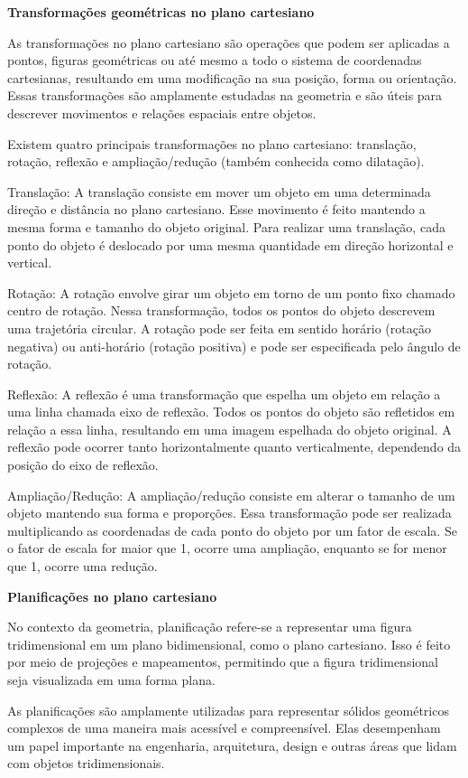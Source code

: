 \textbf{Transformações geométricas no plano cartesiano}

As transformações no plano cartesiano são operações que podem ser
aplicadas a pontos, figuras geométricas ou até mesmo a todo o sistema de
coordenadas cartesianas, resultando em uma modificação na sua posição,
forma ou orientação. Essas transformações são amplamente estudadas na
geometria e são úteis para descrever movimentos e relações espaciais
entre objetos.

Existem quatro principais transformações no plano cartesiano:
translação, rotação, reflexão e ampliação/redução (também conhecida como
dilatação).

Translação: A translação consiste em mover um objeto em uma determinada
direção e distância no plano cartesiano. Esse movimento é feito mantendo
a mesma forma e tamanho do objeto original. Para realizar uma
translação, cada ponto do objeto é deslocado por uma mesma quantidade em
direção horizontal e vertical.

Rotação: A rotação envolve girar um objeto em torno de um ponto fixo
chamado centro de rotação. Nessa transformação, todos os pontos do
objeto descrevem uma trajetória circular. A rotação pode ser feita em
sentido horário (rotação negativa) ou anti-horário (rotação positiva) e
pode ser especificada pelo ângulo de rotação.

Reflexão: A reflexão é uma transformação que espelha um objeto em
relação a uma linha chamada eixo de reflexão. Todos os pontos do objeto
são refletidos em relação a essa linha, resultando em uma imagem
espelhada do objeto original. A reflexão pode ocorrer tanto
horizontalmente quanto verticalmente, dependendo da posição do eixo de
reflexão.

Ampliação/Redução: A ampliação/redução consiste em alterar o tamanho de
um objeto mantendo sua forma e proporções. Essa transformação pode ser
realizada multiplicando as coordenadas de cada ponto do objeto por um
fator de escala. Se o fator de escala for maior que 1, ocorre uma
ampliação, enquanto se for menor que 1, ocorre uma redução.

\textbf{Planificações no plano cartesiano}

No contexto da geometria, planificação refere-se a representar uma
figura tridimensional em um plano bidimensional, como o plano
cartesiano. Isso é feito por meio de projeções e mapeamentos, permitindo
que a figura tridimensional seja visualizada em uma forma plana.

As planificações são amplamente utilizadas para representar sólidos
geométricos complexos de uma maneira mais acessível e compreensível.
Elas desempenham um papel importante na engenharia, arquitetura, design
e outras áreas que lidam com objetos tridimensionais.

